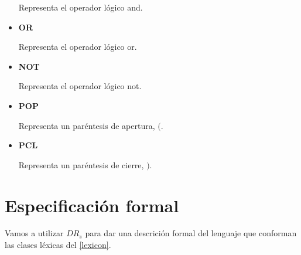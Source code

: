\documentclass[\main/MemoriaPL.tex]{subfiles}
\begin{document}
\begin{itemize}
        \par
        Representa el operador lógico and.
      \item \textbf{OR}
        \par
        Representa el operador lógico or.
      \item \textbf{NOT}
        \par
        Representa el operador lógico not.
      \item \textbf{POP}
        \par
        Representa un paréntesis de apertura, $($.
      \item \textbf{PCL}
        \par
        Representa un paréntesis de cierre, $)$.
    \end{itemize}

  \section{Especificación formal}
    \par
    Vamos a utilizar $DR_s$ para dar una descrición formal del lenguaje que conforman las clases léxicas del \cref{lexicon}.
\end{document}

